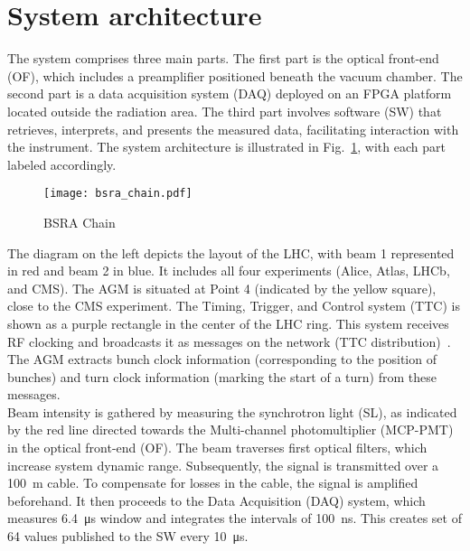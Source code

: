\section{System architecture}
The system comprises three main parts. The first part is the optical front-end
(OF), which includes a preamplifier positioned beneath the vacuum chamber. The
second part is a data acquisition system (DAQ) deployed on an FPGA platform
located outside the radiation area. The third part involves software (SW) that
retrieves, interprets, and presents the measured data, facilitating interaction
with the instrument. The system architecture is illustrated in
Fig.~\ref{fig:bsra_chain}, with each part labeled accordingly.
\begin{figure}[!tbh]
    \centering
    \texttt{[image: bsra\_chain.pdf]}
    \caption{BSRA Chain}
    \label{fig:bsra_chain}
\end{figure} 
The diagram on the left depicts the layout of the LHC, with beam 1 represented
in red and beam 2 in blue. It includes all four experiments (Alice, Atlas,
LHCb, and CMS). The AGM is situated at Point 4 (indicated by the yellow
square), close to the CMS experiment. The Timing, Trigger, and Control system
(TTC) is shown as a purple rectangle in the center of the LHC ring. This system
receives RF clocking and broadcasts it as messages on the network (TTC
distribution)~\cite{ttc_distribution}. The AGM extracts bunch clock information
(corresponding to the position of bunches) and turn clock information (marking
the start of a turn) from these messages.\\
Beam intensity is gathered by measuring the synchrotron light (SL), as
indicated by the red line directed towards the Multi-channel photomultiplier
(MCP-PMT) in the optical front-end (OF). The beam traverses first optical
filters, which increase system dynamic range. Subsequently, the signal is
transmitted over a \SI{100}{m} cable. To compensate for losses in the cable,
the signal is amplified beforehand. It then proceeds to the Data Acquisition
(DAQ) system, which measures \SI{6.4}{\micro\second} window and integrates the
intervals of \SI{100}{\nano\second}. This creates set of 64 values published to
the SW every \SI{10}{\micro\second}.

